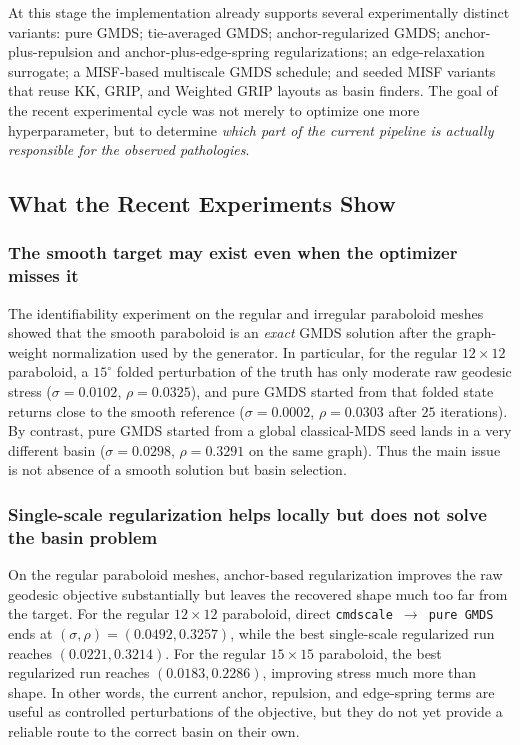 \documentclass[11pt]{article}
\begin{document}
At this stage the implementation already supports several experimentally
distinct variants: pure GMDS; tie-averaged GMDS; anchor-regularized GMDS;
anchor-plus-repulsion and anchor-plus-edge-spring regularizations; an
edge-relaxation surrogate; a MISF-based multiscale GMDS schedule; and seeded
MISF variants that reuse KK, GRIP, and Weighted GRIP layouts as basin
finders.  The goal of the recent experimental cycle was not merely to optimize
one more hyperparameter, but to determine \emph{which part of the current
pipeline is actually responsible for the observed pathologies}.

\subsection{What the Recent Experiments Show}
\label{sec:recent_experiments}

\subsubsection*{The smooth target may exist even when the optimizer misses it}
The identifiability experiment on the regular and irregular paraboloid meshes
showed that the smooth paraboloid is an \emph{exact} GMDS solution after the
graph-weight normalization used by the generator.  In particular, for the
regular $12\times 12$ paraboloid, a $15^\circ$ folded perturbation of the
truth has only moderate raw geodesic stress
($\sigma = 0.0102$, $\rho = 0.0325$), and pure GMDS started from that folded
state returns close to the smooth reference
($\sigma = 0.0002$, $\rho = 0.0303$ after $25$ iterations).  By contrast,
pure GMDS started from a global classical-MDS seed lands in a very different
basin ($\sigma = 0.0298$, $\rho = 0.3291$ on the same graph).  Thus the main
issue is not absence of a smooth solution but basin selection.

\subsubsection*{Single-scale regularization helps locally but does not solve the
basin problem}
On the regular paraboloid meshes, anchor-based regularization improves the raw
geodesic objective substantially but leaves the recovered shape much too far
from the target.  For the regular $12\times 12$ paraboloid, direct
\texttt{cmdscale $\rightarrow$ pure GMDS} ends at
$(\sigma,\rho)=(0.0492, 0.3257)$, while the best single-scale regularized run
reaches $(0.0221, 0.3214)$.  For the regular $15\times 15$ paraboloid, the
best regularized run reaches $(0.0183, 0.2286)$, improving stress much more
than shape.  In other words, the current anchor, repulsion, and edge-spring
terms are useful as controlled perturbations of the objective, but they do not
yet provide a reliable route to the correct basin on their own.
\end{document}
